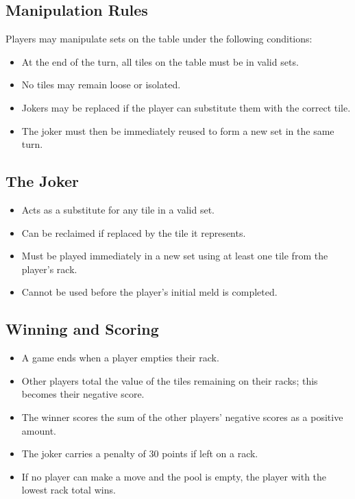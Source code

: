 \documentclass[12pt]{article}
\begin{document}
\subsection{Manipulation Rules}
Players may manipulate sets on the table under the following conditions:
\begin{itemize}
    \item At the end of the turn, all tiles on the table must be in valid sets.
    \item No tiles may remain loose or isolated.
    \item Jokers may be replaced if the player can substitute them with the correct tile.
    \item The joker must then be immediately reused to form a new set in the same turn.
\end{itemize}

\subsection{The Joker}
\begin{itemize}
    \item Acts as a substitute for any tile in a valid set.
    \item Can be reclaimed if replaced by the tile it represents.
    \item Must be played immediately in a new set using at least one tile from the player’s rack.
    \item Cannot be used before the player's initial meld is completed.
\end{itemize}

\subsection{Winning and Scoring}
\begin{itemize}
    \item A game ends when a player empties their rack.
    \item Other players total the value of the tiles remaining on their racks; this becomes their negative score.
    \item The winner scores the sum of the other players’ negative scores as a positive amount.
    \item The joker carries a penalty of 30 points if left on a rack.
    \item If no player can make a move and the pool is empty, the player with the lowest rack total wins.
\end{itemize}
\end{document}
